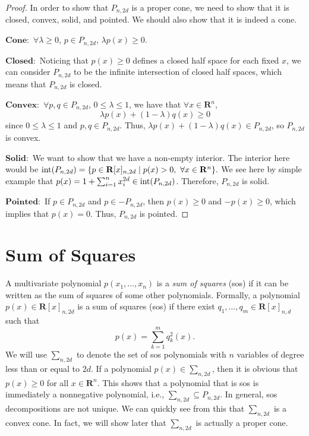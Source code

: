 	\begin{proof}
		In order to show that $P_{n, 2d}$ is a proper cone, we need to show that it is closed, convex, solid, and pointed. We should also show that it is indeed a cone.
		
		$\mathbf{Cone: }$ $\forall \lambda \geq 0$, $p \in P_{n,2d}$, $\lambda p(x) \geq 0$. 
		
		$\mathbf{Closed: }$ Noticing that $p(x) \geq 0$ defines a closed half space for each fixed $x$, we can consider $P_{n, 2d}$ to be the infinite intersection of closed half spaces, which means that $P_{n, 2d}$ is closed. 
		
		$\mathbf{Convex: }$ $\forall p, q \in P_{n, 2d}$, $0 \leq \lambda \leq 1$, we have that $\forall x \in \mathbf{R}^n$, 
		$$
		\lambda p(x) + (1-\lambda) q(x) \geq 0
		$$
		since $0 \leq \lambda \leq 1$ and $p, q \in P_{n, 2d}$. Thus, $\lambda p(x) + (1- \lambda) q(x) \in P_{n, 2d}$, so $P_{n, 2d}$ is convex. 
		
		$\mathbf{Solid: }$ We want to show that we have a non-empty interior. The interior here would be $\textnormal{int}(P_{n, 2d}) = \{p \in \mathbf{R}[x]_{n, 2d} \mid p(x) > 0, \textnormal{ } \forall x \in \mathbf{R}^n\}.$ We see here by simple example that $p(x) = 1 + \sum_{i=1}^{n} x_{i}^{2d} \in \textnormal{int}(P_{n,2d})$. Therefore, $P_{n, 2d}$ is solid.
		
		$\mathbf{Pointed: }$ If $p \in P_{n, 2d}$ and $p \in -P_{n, 2d}$, then $p(x) \geq 0$ and $-p(x) \geq 0$, which implies that $p(x) = 0$. Thus, $P_{n, 2d}$ is pointed.
	\end{proof}
	
	\section{Sum of Squares}
	
	A multivariate polynomial $p(x_1, \dots, x_n)$ is a \emph{sum of squares} (sos) if it can be written as the sum of squares of some other polynomials. Formally, a polynomial $p(x) \in \mathbf{R}[x]_{n, 2d}$ is a sum of squares (sos) if there exist $q_1, \dots, q_m \in \mathbf{R}[x]_{n,d}$ such that 
	\begin{equation} \label{sos}
		p(x) = \sum_{k=1}^{m} q_k^2(x). 
	\end{equation}
	We will use $\sum_{n, 2d}$ to denote the set of sos polynomials with $n$ variables of degree less than or equal to $2d$. If a polynomial $p(x) \in \sum_{n, 2d}$, then it is obvious that $p(x) \geq 0$ for all $x \in \mathbf{R}^n$. This shows that a polynomial that is sos is immediately a nonnegative polynomial, i.e., $\sum_{n, 2d} \subseteq P_{n,2d}$. In general, sos decompositions are not unique. We can quickly see from this that $\sum_{n, 2d}$ is a convex cone. In fact, we will show later that $\sum_{n, 2d}$ is actually a proper cone.
	
